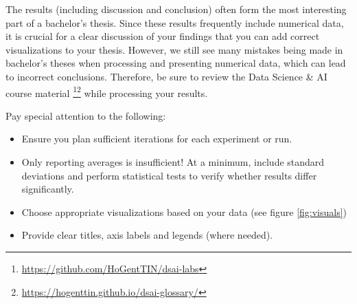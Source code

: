 The results (including discussion and conclusion) often form the most interesting part of a bachelor’s thesis. Since these results frequently include numerical data, it is crucial for a clear discussion of your findings that you can add correct visualizations to your thesis. However, we still see many mistakes being made in bachelor’s theses when processing and presenting numerical data, which can lead to incorrect conclusions. Therefore, be sure to review the Data Science \& AI course material \footnote{\url{https://github.com/HoGentTIN/dsai-labs}}\footnote{\url{https://hogenttin.github.io/dsai-glossary/}} while processing your results.

Pay special attention to the following:
\begin{itemize}
	\item Ensure you plan sufficient iterations for each experiment or run.
	\item Only reporting averages is insufficient! At a minimum, include standard deviations and perform statistical tests to verify whether results differ significantly.
	\item Choose appropriate visualizations based on your data (see figure \ref{fig:visuals})
	\item Provide clear titles, axis labels and legends (where needed).
\end{itemize}



